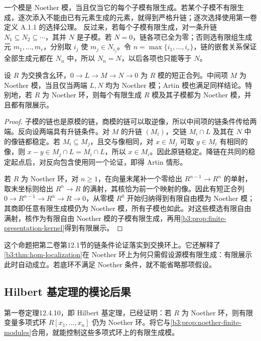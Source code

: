 一个模是 Noether 模，当且仅当它的每个子模有限生成。若某个子模不有限生成，逐次添入不能由已有元素生成的元素，就得到严格升链；逐次选择使用第一卷定义 A.1.1 的选择公理。 反过来，若每个子模有限生成，对一条升链 \(N_1\subseteq N_2\subseteq\cdots\)，其并 \(N\) 是子模。若 \(N=0\)，链各项已全为零；否则选有限组生成元 \(m_1,\ldots,m_r\)，分别取 \(i_j\) 使 \(m_j\in N_{i_j}\)。令 \(n=\max\{i_1,\ldots,i_r\}\)，链的嵌套关系保证全部生成元都在 \(N_n\) 中，所以 \(N_n=N\)，以后各项也只能等于 \(N\)。

\begin{proposition}\label{b3:prop:noether-finite-modules}
	设 \(R\) 为交换含幺环，\(0\rightarrow L\rightarrow M\rightarrow N\rightarrow0\) 为 \(R\) 模的短正合列。中间项 \(M\) 为 Noether 模，当且仅当两端 \(L,N\) 均为 Noether 模；Artin 模也满足同样结论。特别地，若 \(R\) 为 Noether 环，则每个有限生成 \(R\) 模及其子模都为 Noether 模，并且都有限展示。
\end{proposition}
\begin{proof}
	子模的链也是原模的链，商模的链可以取逆像，所以中间项的链条件传给两端。反向设两端具有升链条件。对 \(M\) 的升链 \((M_i)\)，交链 \(M_i\cap L\) 及其在 \(N\) 中的像链都稳定。若 \(M_i\subseteq M_j\)，且交与像相同，对 \(x\in M_j\) 可取 \(y\in M_i\) 有相同的像，则 \(x-y\in M_j\cap L=M_i\cap L\)，所以 \(x\in M_i\)。因此原链稳定。降链在共同的稳定起点后，对反向包含使用同一个论证，即得 Artin 情形。

	若 \(R\) 为 Noether 环，对 \(n\ge1\)，在向量末尾补一个零给出 \(R^{n-1}\to R^n\) 的单射，取末坐标则给出 \(R^n\to R\) 的满射，其核恰为前一个映射的像。因此有短正合列 \(0\rightarrow R^{n-1}\rightarrow R^n\rightarrow R\rightarrow0\)，从零模 \(R^0\) 开始归纳得到有限自由模为 Noether 模；其商即任意有限生成模仍为 Noether 模，所有子模也如此。对这些模选有限自由满射，核作为有限自由 Noether 模的子模有限生成，再用\cref{b3:prop:finite-presentation-kernel}得到有限展示。
\end{proof}

这个命题把第二卷第12.1节的链条件论证落实到交换环上。它还解释了\cref{b3:thm:hom-localization}在 Noether 环上为何只需假设源模有限生成：有限展示此时自动成立。若底环不满足 Noether 条件，就不能省略那项假设。

\subsection{Hilbert 基定理的模论后果}
\label{b3:subsec:0301:03}

第一卷定理12.4.10，即 Hilbert 基定理，已经证明：若 \(R\) 为 Noether 环，则有限变量多项式环 \(R[x_1,\ldots,x_n]\) 仍为 Noether 环。将它与\cref{b3:prop:noether-finite-modules}合用，就能控制这些多项式环上的有限生成模。

